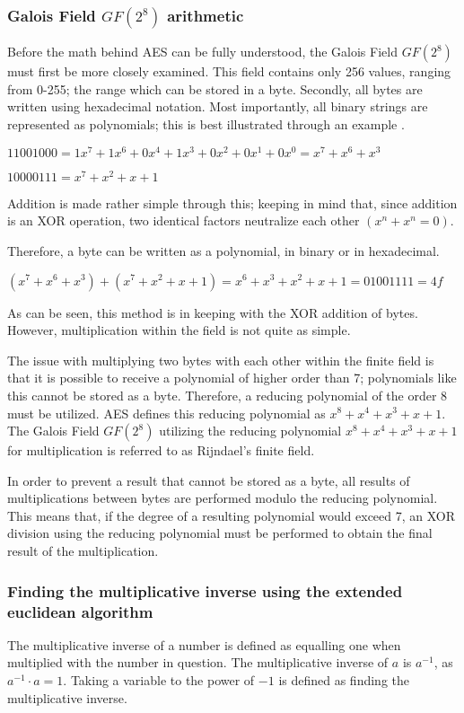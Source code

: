 \documentclass[12pt, a4paper]{report}
\theoremstyle{definition}
\theoremstyle{remark}
\begin{document}
\subsubsection{Galois Field $GF(2^8)$ arithmetic}
\label{Galois}
Before the math behind AES can be fully understood, the Galois Field $GF(2^8)$ must first be more closely examined. This field contains only 256 values, ranging from 0-255; the range which can be stored in a byte. Secondly, all bytes are written using hexadecimal notation. Most importantly, all binary strings are represented as polynomials; this is best illustrated through an example \cite{GFieldExample}.

$11001000 = 1x^7+1x^6+0x^4+1x^3+0x^2+0x^1+0x^0 = x^7+x^6+x^3 $ 

$10000111 = x^7+x^2+x+1$

Addition is made rather simple through this; keeping in mind that, since addition is an XOR operation, two identical factors neutralize each other $(x^n+x^n = 0)$.

Therefore, a byte can be written as a polynomial, in binary or in hexadecimal\cite{BinHex}.

$(x^7+x^6+x^3)+(x^7+x^2+x+1) = x^6+x^3+x^2+x+1 = 01001111 = 4f$

As can be seen, this method is in keeping with the XOR addition of bytes. However, multiplication within the field is not quite as simple.

The issue with multiplying two bytes with each other within the finite field is that it is possible to receive a polynomial of higher order than 7; polynomials like this cannot be stored as a byte. Therefore, a reducing polynomial of the order 8 must be utilized. AES defines this reducing polynomial as $x^8+x^4+x^3+x+1$. The Galois Field $GF(2^8)$ utilizing the reducing polynomial $x^8+x^4+x^3+x+1$ for multiplication is referred to as Rijndael's finite field\cite{RFiniteField}.

In order to prevent a result that cannot be stored as a byte, all results of multiplications between bytes are performed modulo the reducing polynomial. This means that, if the degree of a resulting polynomial would exceed 7, an XOR division using the reducing polynomial must be performed to obtain the final result of the multiplication.

\subsubsection{Finding the multiplicative inverse using the extended euclidean algorithm}
\label{Inverse}
The multiplicative inverse of a number is defined as equalling one when multiplied with the number in question. The multiplicative inverse of $a$ is $a^{-1}$, as $a^{-1} \cdot a = 1$. Taking a variable to the power of $-1$ is defined as finding the multiplicative inverse.
\end{document}

